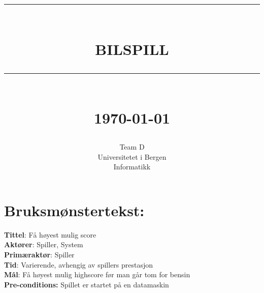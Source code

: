 \documentclass[12pt]{report}
\newcommand{\HRule}[1]{\rule{\linewidth}{#1}}
\begin{document}
\title{ \normalsize \textsc{}
		\\ [2.0cm]
		\HRule{0.5pt} \\
		\LARGE \textbf{\uppercase{Bilspill}}
		\HRule{2pt} \\ [0.5cm]
		\normalsize \today \vspace*{5\baselineskip}}
\date{}
\author{
		Team D  \\ 
		Universitetet i Bergen \\
		Informatikk }
\maketitle
\tableofcontents
\newpage
\sectionfont{\scshape}
\section*{Bruksm{\o}nstertekst:}

\textbf{Tittel}: F{\aa} h{\o}yest mulig score
\bigskip \\
\textbf{Akt{\o}rer}: Spiller, System
\bigskip \\
\textbf{Prim{\ae}rakt{\o}r}: Spiller
\bigskip \\
\textbf{Tid}: Varierende, avhengig av spillers prestasjon
\bigskip \\
\textbf{M{\aa}l}: F{\aa} h{\o}yest mulig highscore f{\o}r man g{\aa}r tom for bensin
\bigskip \\
\textbf{Pre-conditions:} Spillet er startet p{\aa} en datamaskin
\end{document}
